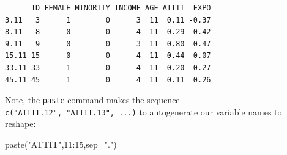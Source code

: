 \documentclass[
  letterpaper,
  DIV=11,
  numbers=noendperiod]{scrreprt}
\newenvironment{Shaded}{\begin{snugshade}}{\end{snugshade}}
\newcommand{\AttributeTok}[1]{\textcolor[rgb]{0.49,0.56,0.16}{#1}}
\newcommand{\CommentTok}[1]{\textcolor[rgb]{0.38,0.63,0.69}{\textit{#1}}}
\newcommand{\DecValTok}[1]{\textcolor[rgb]{0.25,0.63,0.44}{#1}}
\newcommand{\DocumentationTok}[1]{\textcolor[rgb]{0.73,0.13,0.13}{\textit{#1}}}
\newcommand{\FunctionTok}[1]{\textcolor[rgb]{0.02,0.16,0.49}{#1}}
\newcommand{\NormalTok}[1]{\textcolor[rgb]{0.00,0.44,0.13}{#1}}
\newcommand{\OtherTok}[1]{\textcolor[rgb]{0.00,0.44,0.13}{#1}}
\newcommand{\SpecialCharTok}[1]{\textcolor[rgb]{0.25,0.44,0.63}{#1}}
\newcommand{\StringTok}[1]{\textcolor[rgb]{0.25,0.44,0.63}{#1}}
\begin{document}
\begin{Shaded}
\end{Shaded}

\begin{verbatim}
      ID FEMALE MINORITY INCOME AGE ATTIT  EXPO
3.11   3      1        0      3  11  0.11 -0.37
8.11   8      0        0      4  11  0.29  0.42
9.11   9      0        0      3  11  0.80  0.47
15.11 15      0        0      4  11  0.44  0.07
33.11 33      1        0      4  11  0.20 -0.27
45.11 45      1        0      4  11  0.11  0.26
\end{verbatim}

Note, the \texttt{paste} command makes the sequence
\texttt{c("ATTIT.12",\ "ATTIT.13",\ ...)} to autogenerate our variable
names to reshape:

\begin{Shaded}
\begin{Highlighting}[]
\FunctionTok{paste}\NormalTok{(}\StringTok{"ATTIT"}\NormalTok{,}\DecValTok{11}\SpecialCharTok{:}\DecValTok{15}\NormalTok{,}\AttributeTok{sep=}\StringTok{"."}\NormalTok{)}
\end{Highlighting}
\end{Shaded}
\end{document}
